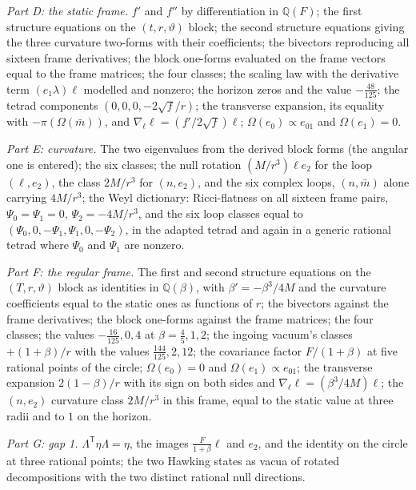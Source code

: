 \documentclass[11pt]{article}
\theoremstyle{definition}
\theoremstyle{plain}
\providecommand{\Q}{}\renewcommand{\Q}{\mathbb{Q}}
\providecommand{\mb}{}\renewcommand{\mb}{\bar m}
\providecommand{\pv}{}\renewcommand{\pv}{\pi}
\begin{document}
\emph{Part D: the static frame.} $f'$ and $f''$ by differentiation in $\Q(F)$; the first structure equations on the $(t, r, \vartheta)$ block; the second structure equations giving the three curvature two-forms with their coefficients; the bivectors reproducing all sixteen frame derivatives; the block one-forms evaluated on the frame vectors equal to the frame matrices; the four classes; the scaling law with the derivative term $(e_{1}\lambda)\ell$ modelled and nonzero; the horizon zeros and the value $-\tfrac{48}{125}$; the tetrad components $(0, 0, 0, -2\sqrt f/r)$; the transverse expansion, its equality with $-\pv(\Omega(\mb))$, and $\nabla_{\ell}\ell = (f'/2\sqrt f)\ell$; $\Omega(e_{0}) \propto e_{01}$ and $\Omega(e_{1}) = 0$.

\emph{Part E: curvature.} The two eigenvalues from the derived block forms (the angular one is entered); the six classes; the null rotation $(M/r^{3})\ell e_{2}$ for the loop $(\ell, e_{2})$, the class $2M/r^{3}$ for $(n, e_{2})$, and the six complex loops, $(n, \mb)$ alone carrying $4M/r^{3}$; the Weyl dictionary: Ricci-flatness on all sixteen frame pairs, $\Psi_{0} = \Psi_{1} = 0$, $\Psi_{2} = -4M/r^{3}$, and the six loop classes equal to $(\Psi_{0}, 0, -\Psi_{1}, \Psi_{1}, 0, -\Psi_{2})$, in the adapted tetrad and again in a generic rational tetrad where $\Psi_{0}$ and $\Psi_{1}$ are nonzero.

\emph{Part F: the regular frame.} The first and second structure equations on the $(T, r, \vartheta)$ block as identities in $\Q(\beta)$, with $\beta' = -\beta^{3}/4M$ and the curvature coefficients equal to the static ones as functions of $r$; the bivectors against the frame derivatives; the block one-forms against the frame matrices; the four classes; the values $-\tfrac{16}{125}, 0, 4$ at $\beta = \tfrac45, 1, 2$; the ingoing vacuum's classes $+(1 + \beta)/r$ with the values $\tfrac{144}{125}, 2, 12$; the covariance factor $F/(1 + \beta)$ at five rational points of the circle; $\Omega(e_{0}) = 0$ and $\Omega(e_{1}) \propto e_{01}$; the transverse expansion $2(1 - \beta)/r$ with its sign on both sides and $\nabla_{\ell}\ell = (\beta^{3}/4M)\ell$; the $(n, e_{2})$ curvature class $2M/r^{3}$ in this frame, equal to the static value at three radii and to $1$ on the horizon.

\emph{Part G: gap 1.} $\Lambda^{\mathsf T}\eta\Lambda = \eta$, the images $\tfrac{F}{1 + \beta}\ell$ and $e_{2}$, and the identity on the circle at three rational points; the two Hawking states as vacua of rotated decompositions with the two distinct rational null directions.
\end{document}
